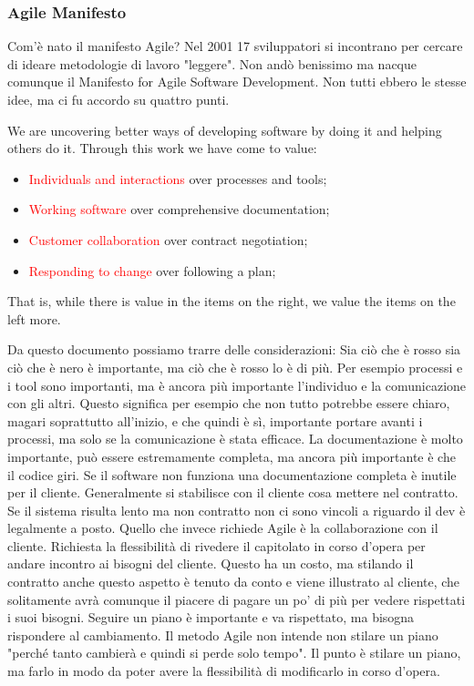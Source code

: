 \begin{itemize}
	\subsubsection{Agile Manifesto}
	Com'è nato il manifesto Agile? Nel 2001 17 sviluppatori si incontrano per cercare di ideare metodologie di lavoro "leggere". Non andò benissimo ma nacque comunque il Manifesto for Agile Software Development. Non tutti ebbero le stesse idee, ma ci fu accordo su quattro punti.\newline\newline
	\begin{info}[MANIFESTO]
		\newline We are uncovering better ways of developing
		software by doing it and helping others do it.\newline
		Through this work we have come to value:
		\begin{itemize}
			\item \textcolor{red}{Individuals and interactions} over processes and tools;
			\item \textcolor{red}{Working software} over comprehensive documentation;
			\item \textcolor{red}{Customer collaboration} over contract negotiation;
			\item \textcolor{red}{Responding to change} over following a plan;
		\end{itemize}
		That is, while there is value in the items on
		the right, we value the items on the left more.
	\end{info}
	Da questo documento possiamo trarre delle considerazioni:\newline
	Sia ciò che è rosso sia ciò che è nero è importante, ma ciò che è rosso lo è di più. Per esempio processi e i tool sono importanti, ma è ancora più importante l'individuo e la comunicazione con gli altri. Questo significa per esempio che non tutto potrebbe essere chiaro, magari soprattutto all'inizio, e che quindi è sì, importante portare avanti i processi, ma solo se la comunicazione è stata efficace.\newline
	La documentazione è molto importante, può essere estremamente completa, ma ancora più importante è che il codice giri. Se il software non funziona una documentazione completa è inutile per il cliente.\newline
	Generalmente si stabilisce con il cliente cosa mettere nel contratto. Se il sistema risulta lento ma non contratto non ci sono vincoli a riguardo il dev è legalmente a posto. Quello che invece richiede Agile è la collaborazione con il cliente. Richiesta la flessibilità di rivedere il capitolato in corso d'opera per andare incontro ai bisogni del cliente. Questo ha un costo, ma stilando il contratto anche questo aspetto è tenuto da conto e viene illustrato al cliente, che solitamente avrà comunque il piacere di pagare un po' di più per vedere rispettati i suoi bisogni.\newline
	Seguire un piano è importante e va rispettato, ma bisogna rispondere al cambiamento. Il metodo Agile non intende non stilare un piano "perché tanto cambierà e quindi si perde solo tempo". Il punto è stilare un piano, ma farlo in modo da poter avere la flessibilità di modificarlo in corso d'opera.
\end{itemize}
